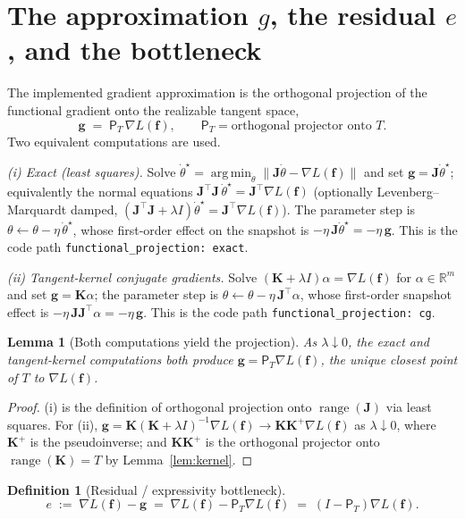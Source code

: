 \documentclass[conference]{IEEEtran}
\newtheorem{lemma}{Lemma}
\newtheorem{definition}{Definition}
\theoremstyle{remark}
\DeclareMathOperator{\range}{range}
\DeclareMathOperator*{\argmin}{arg\,min}
\newcommand{\R}{\mathbb{R}}
\newcommand{\norm}[1]{\lVert #1\rVert}
\newcommand{\grad}{\nabla}
\newcommand{\PT}{\mathsf{P}_{T}}
\newcommand{\J}{\mathbf{J}}
\newcommand{\K}{\mathbf{K}}
\newcommand{\f}{\bm{f}}
\newcommand{\g}{\bm{g}}
\newcommand{\transpose}{^{\!\top}}
\begin{document}
\section{The approximation $g$, the residual $e$, and the bottleneck}
The implemented gradient approximation is the orthogonal projection of the
functional gradient onto the realizable tangent space,
\begin{equation}\label{eq:proj}
\g \;=\; \PT\,\grad L(\f),\qquad
\PT=\text{orthogonal projector onto }T .
\end{equation}
Two equivalent computations are used.

\emph{(i) Exact (least squares).} Solve
$\dot\theta^\star=\argmin_{\dot\theta}\norm{\J\dot\theta-\grad L(\f)}$ and set
$\g=\J\dot\theta^\star$; equivalently the normal equations
$\J\transpose\J\,\dot\theta^\star=\J\transpose\grad L(\f)$ (optionally
Levenberg--Marquardt damped, $(\J\transpose\J+\lambda I)\dot\theta^\star
=\J\transpose\grad L(\f)$). The parameter step is
$\theta\leftarrow\theta-\eta\,\dot\theta^\star$, whose first-order effect on the
snapshot is $-\eta\,\J\dot\theta^\star=-\eta\,\g$. This is the code path
\texttt{functional\_projection: exact}.

\emph{(ii) Tangent-kernel conjugate gradients.} Solve $(\K+\lambda I)\alpha
=\grad L(\f)$ for $\alpha\in\R^m$ and set $\g=\K\alpha$; the parameter step is
$\theta\leftarrow\theta-\eta\,\J\transpose\alpha$, whose first-order snapshot
effect is $-\eta\,\J\J\transpose\alpha=-\eta\,\g$. This is the code path
\texttt{functional\_projection: cg}.

\begin{lemma}[Both computations yield the projection]\label{lem:proj}
As $\lambda\downarrow0$, the exact and tangent-kernel computations both produce
$\g=\PT\grad L(\f)$, the unique closest point of $T$ to $\grad L(\f)$.
\end{lemma}
\begin{proof}
(i) is the definition of orthogonal projection onto $\range(\J)$ via least squares.
For (ii), $\g=\K(\K+\lambda I)^{-1}\grad L(\f)\to \K\K^{+}\grad L(\f)$ as
$\lambda\downarrow0$, where $\K^{+}$ is the pseudoinverse; and $\K\K^{+}$ is the
orthogonal projector onto $\range(\K)=T$ by Lemma~\ref{lem:kernel}.
\end{proof}

\begin{definition}[Residual / expressivity bottleneck]
\begin{equation}\label{eq:residual}
e \;:=\; \grad L(\f)-\g \;=\; \grad L(\f)-\PT\grad L(\f)\;=\;(I-\PT)\grad L(\f).
\end{equation}
\end{definition}
\end{document}
